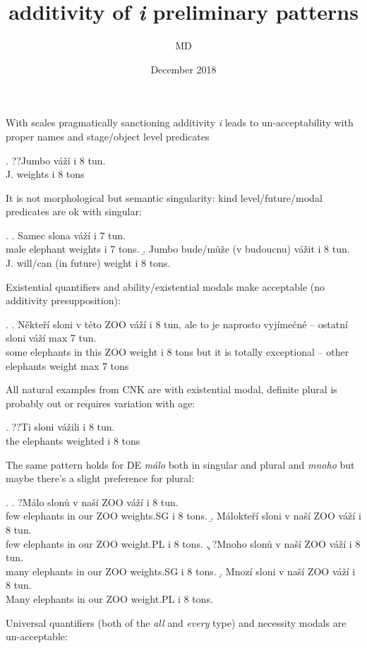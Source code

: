 \documentclass{article}
\title{additivity of \textit{i} preliminary patterns}
\author{MD}
\date{December 2018}
\begin{document}
\maketitle

With scales pragmatically sanctioning additivity \textit{i} leads to un-acceptability with proper names and stage/object level predicates

\ex. ??Jumbo váží i 8 tun.\\
J. weights i 8 tons

It is not morphological but semantic singularity: kind level/future/modal predicates are ok with singular:

\ex. \a. Samec slona váží i 7 tun.\\
male elephant weights i 7 tons.
\b. Jumbo bude/může (v budoucnu) vážit i 8 tun.\\
J. will/can (in future) weight i 8 tons.

Existential quantifiers and ability/existential modals make \LLast acceptable (no additivity presupposition):

\ex. \a. Někteří sloni v této ZOO váží i 8 tun, ale to je naprosto vyjímečné -- ostatní sloni váží max 7 tun.\\
some elephants in this ZOO weight i 8 tons but it is totally exceptional -- other elephants weight max 7 tons

All natural examples from CNK are with existential modal, definite plural is probably out or requires variation with age:

\ex. ??Ti sloni vážili i 8 tun.\\
the elephants weighted i 8 tons

The same pattern holds for DE \textit{málo} both in singular and plural and \textit{mnoho} but maybe there's a slight preference for plural:

\ex. \a. ?Málo slonů v naší ZOO váží i 8 tun.\\
few elephants in our ZOO weights.SG i 8 tons.
\b. Málokteří sloni v naší ZOO váží i 8 tun.\\
few elephants in our ZOO weight.PL i 8 tons.
\c. ?Mnoho slonů v naší ZOO váží i 8 tun.\\
many elephants in our ZOO weights.SG i 8 tons.
\d. Mnozí sloni v naší ZOO váží i 8 tun.\\
Many elephants in our ZOO weight.PL i 8 tons.

Universal quantifiers (both of the \textit{all} and \textit{every} type) and necessity modals are un-acceptable:
\end{document}
